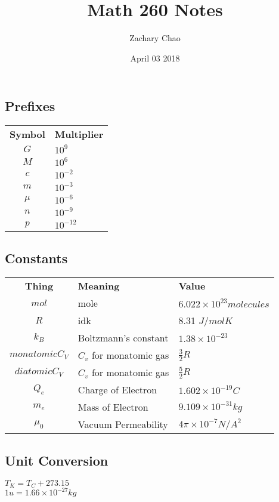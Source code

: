 \documentclass[12pt, letterpaper, twoside]{article}
\title{Math 260 Notes}
\author{Zachary Chao}
\date{April 03 2018}
\begin{document}
  \subsection*{Prefixes}
    \begin{tabular}{c l}
  	  \textbf{Symbol} & \textbf{Multiplier}\\
      $G$ & $10^9$\\
      $M$ & $10^6$\\
      $c$ & $10^{-2}$\\
      $m$ & $10^{-3}$\\
      $\mu$ & $10^{-6}$\\
      $n$ & $10^{-9}$\\
      $p$ & $10^{-12}$\\
  \end{tabular}
  
  \subsection*{Constants}
    \begin{tabular}{c l l}
      \textbf{Thing} & \textbf{Meaning} & \textbf{Value}\\
      $mol$ & mole & $6.022 \times 10^{23} molecules$\\
      $R$ & idk & 8.31 $J / mol K$\\
      $k_B$ & Boltzmann's constant & $1.38 \times 10^{-23}$\\
	  $monatomic C_V$ & $C_v$ for monatomic gas & $\frac{3}{2}R$\\
	  $diatomic C_V$ & $C_v$ for monatomic gas & $\frac{5}{2}R$\\
	         
      
      
      $Q_e$ & Charge of Electron & $1.602 \times 10^{-19}C$\\
      $m_e$ & Mass of Electron& $9.109 \times 10^{-31}kg$\\
      $\mu_0$ & Vacuum Permeability & $4 \pi \times 10^{-7}N/A^ 2$\\
      
    \end{tabular}
    
  \subsection*{Unit Conversion}
    $T_K = T_C + 273.15$\\
    $1 u = 1.66 \times 10^{-27} kg$\\
    
\end{document}
